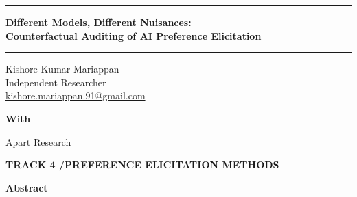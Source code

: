 \documentclass[11pt,letterpaper]{article}
\begin{document}
\begin{center}
  \vspace*{-0.33in}
  \rule{0.84\textwidth}{0.75pt}

  \vspace{0.27in}

  {\bfseries\fontsize{20}{23.5}\selectfont
    Different Models, Different Nuisances:\\[2pt]
    Counterfactual Auditing of AI Preference Elicitation\footnotemark\par}

  \vspace{0.30in}
  \rule{0.84\textwidth}{0.55pt}

  \vspace{0.10in}

  {\fontsize{11}{13.2}\selectfont
    Kishore Kumar Mariappan\\
    Independent Researcher\\
    \href{mailto:kishore.mariappan.91@gmail.com}{kishore.mariappan.91@gmail.com}\par}

  \vspace{0.13in}
  {\bfseries\fontsize{11}{13.2}\selectfont With\par}
  \vspace{0.08in}
  {\fontsize{11}{13.2}\selectfont Apart Research\par}

  \vspace{0.14in}
  {{\arialfont\bfseries\fontsize{9.5}{11}\selectfont
    TRACK 4 \enspace\textcolor{ApartGrey}{/}\enspace PREFERENCE ELICITATION METHODS}\par}

  \vspace{0.16in}
  {\bfseries\fontsize{14}{16.8}\selectfont Abstract\par}


\end{center}
\end{document}
